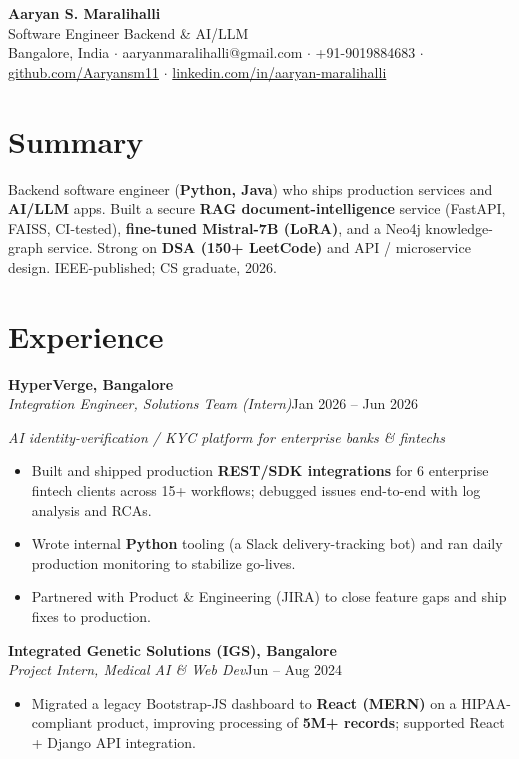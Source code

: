 \documentclass[10pt,a4paper]{article}
\begin{document}
\vspace*{-1cm}
\begin{center}
{\LARGE\bfseries Aaryan S. Maralihalli}\\[0.5em]
{\large Software Engineer  \textbar{}  Backend \& AI/LLM}\\[0.3em]
Bangalore, India $\cdot$ aaryanmaralihalli@gmail.com $\cdot$ +91-9019884683 $\cdot$ \href{https://github.com/Aaryansm11}{github.com/Aaryansm11} $\cdot$ \href{https://linkedin.com/in/aaryan-maralihalli}{linkedin.com/in/aaryan-maralihalli}
\end{center}\vspace{0.4ex}
\section*{Summary}
Backend software engineer (\textbf{Python, Java}) who ships production services and \textbf{AI/LLM} apps. Built a secure \textbf{RAG document-intelligence} service (FastAPI, FAISS, CI-tested), \textbf{fine-tuned Mistral-7B (LoRA)}, and a Neo4j knowledge-graph service. Strong on \textbf{DSA (150+ LeetCode)} and API / microservice design. IEEE-published; CS graduate, 2026.\par\vspace{2pt}
\section*{Experience}
\vspace{1pt}\textbf{HyperVerge, Bangalore}\\
\textit{Integration Engineer, Solutions Team (Intern)}\hfill Jan 2026 -- Jun 2026\par\vspace{1pt}
{\small\itshape AI identity-verification / KYC platform for enterprise banks \& fintechs}\par\vspace{1pt}
\begin{itemize}
\item Built and shipped production \textbf{REST/SDK integrations} for 6 enterprise fintech clients across 15+ workflows; debugged issues end-to-end with log analysis and RCAs.
\item Wrote internal \textbf{Python} tooling (a Slack delivery-tracking bot) and ran daily production monitoring to stabilize go-lives.
\item Partnered with Product \& Engineering (JIRA) to close feature gaps and ship fixes to production.
\end{itemize}
\vspace{1pt}\textbf{Integrated Genetic Solutions (IGS), Bangalore}\\
\textit{Project Intern, Medical AI \& Web Dev}\hfill Jun -- Aug 2024\par\vspace{1pt}
\begin{itemize}
\item Migrated a legacy Bootstrap-JS dashboard to \textbf{React (MERN)} on a HIPAA-compliant product, improving processing of \textbf{5M+ records}; supported React + Django API integration.
\end{itemize}
\end{document}
